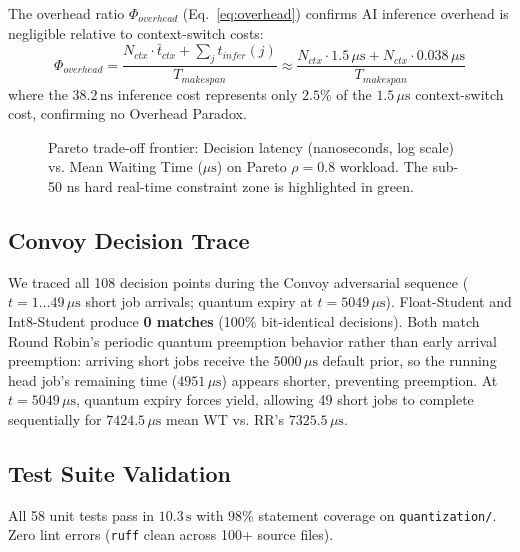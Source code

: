 The overhead ratio $\Phi_{overhead}$ (Eq.~\ref{eq:overhead}) confirms AI
inference overhead is negligible relative to context-switch costs:
\begin{equation}
  \Phi_{overhead} = \frac{N_{ctx} \cdot \bar{t}_{ctx} + \sum_j t_{infer}(j)}{T_{makespan}}
  \approx \frac{N_{ctx} \cdot 1.5\,\mu\text{s} + N_{ctx} \cdot 0.038\,\mu\text{s}}{T_{makespan}}
  \label{eq:overhead}
\end{equation}
where the $38.2\,\text{ns}$ inference cost represents only $2.5\%$ of the
$1.5\,\mu\text{s}$ context-switch cost, confirming no Overhead Paradox.

\begin{figure}[t]
  \centering
  \caption{Pareto trade-off frontier: Decision latency (nanoseconds, log scale) vs. Mean Waiting Time ($\mu\text{s}$) on Pareto $\rho = 0.8$ workload. The sub-50 ns hard real-time constraint zone is highlighted in green.}
  \label{fig:pareto_frontier}
\end{figure}

\subsection{Convoy Decision Trace}
\label{subsec:convoy}

We traced all 108 decision points during the Convoy adversarial sequence
($t = 1\ldots 49\,\mu\text{s}$ short job arrivals; quantum expiry at
$t = 5049\,\mu\text{s}$). Float-Student and Int8-Student produce \textbf{0
matches} (100\% bit-identical decisions). Both match Round Robin's periodic
quantum preemption behavior rather than early arrival preemption: arriving short
jobs receive the $5000\,\mu\text{s}$ default prior, so the running head
job's remaining time ($4951\,\mu\text{s}$) appears shorter, preventing
preemption. At $t = 5049\,\mu\text{s}$, quantum expiry forces yield, allowing
49 short jobs to complete sequentially for $7424.5\,\mu\text{s}$ mean WT vs.
RR's $7325.5\,\mu\text{s}$.

\subsection{Test Suite Validation}
\label{subsec:tests}

All 58 unit tests pass in $10.3\,\text{s}$ with 98\% statement coverage on
\texttt{quantization/}. Zero lint errors (\texttt{ruff} clean across 100+
source files).


